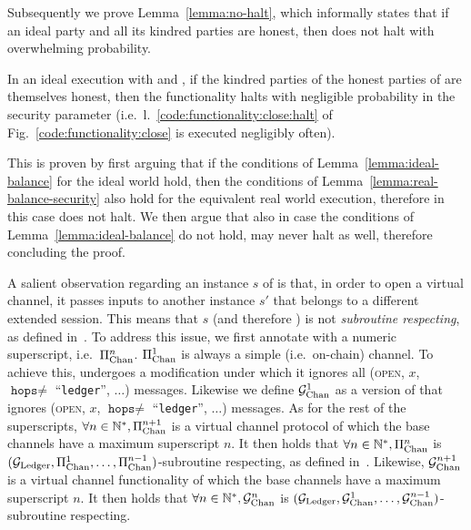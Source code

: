   Subsequently we prove Lemma~\ref{lemma:no-halt}, which informally states that
  if an ideal party and all its kindred parties are honest, then \fchan does not
  halt with overwhelming probability.

\begin{lemma}[No halt]
\label{lemma:no-halt}
  In an ideal execution with \fchan and \simulator, if the kindred parties of
  the honest parties of \fchan are themselves honest, then the functionality
  halts with negligible probability in the security parameter (i.e.\
  l.~\ref{code:functionality:close:halt} of Fig.~\ref{code:functionality:close}
  is executed negligibly often).
\end{lemma}

  This is proven by first arguing that if
  the conditions of Lemma~\ref{lemma:ideal-balance} for the ideal world hold,
  then the conditions of Lemma~\ref{lemma:real-balance-security} also hold for
  the equivalent real world execution, therefore in this case \fchan does not
  halt. We then argue that also in case the conditions of
  Lemma~\ref{lemma:ideal-balance} do not hold, \fchan may never halt as well,
  therefore concluding the proof.

  A salient observation regarding an instance $s$ of \pchan is that, in order to
  open a virtual channel, it passes inputs to another \pchan instance $s'$ that
  belongs to a different extended session. This means that $s$ (and therefore
  \pchan) is not \emph{subroutine respecting}, as defined in~\cite{uc}. To
  address this issue, we first annotate \pchan with a numeric superscript, i.e.\
  $\Pi_{\mathrm{Chan}}^{n}$. $\Pi_{\mathrm{Chan}}^{1}$ is always a simple (i.e.\ on-chain) channel. To
  achieve this, \pchan undergoes a modification under which it ignores all
  (\textsc{open}, $x$, $\texttt{hops} \neq$ ``\texttt{ledger}'', $\dots$)
  messages. Likewise we define $\mathcal{G}_{\mathrm{Chan}}^{1}$ as a version of \fchan that
  ignores (\textsc{open}, $x$, $\texttt{hops} \neq$ ``\texttt{ledger}'',
  $\dots$) messages. As for the rest of the superscripts, $\forall n \in
  \mathbb{N}^*, \Pi_{\mathrm{Chan}}^{n+1}$ is a virtual channel protocol \pchan of which
  the base channels have a maximum superscript $n$. It then holds that $\forall
  n \in \mathbb{N}^*, \Pi_{\mathrm{Chan}}^{n}$ is $(\mathcal{G}_{\mathrm{Ledger}}, \Pi_{\mathrm{Chan}}^{1}, \dots,
  \Pi_{\mathrm{Chan}}^{n-1})$-subroutine respecting, as defined
  in~\cite{DBLP:conf/tcc/BadertscherCHTZ20}. Likewise, $\mathcal{G}_{\mathrm{Chan}}^{n+1}$ is a
  virtual channel functionality \fchan of which the base channels have a maximum
  superscript $n$. It then holds that $\forall n \in \mathbb{N}^*, \mathcal{G}_{\mathrm{Chan}}^{n}$
  is $(\mathcal{G}_{\mathrm{Ledger}}, \mathcal{G}_{\mathrm{Chan}}^{1}, \dots, \mathcal{G}_{\mathrm{Chan}}^{n-1})$-subroutine respecting.

